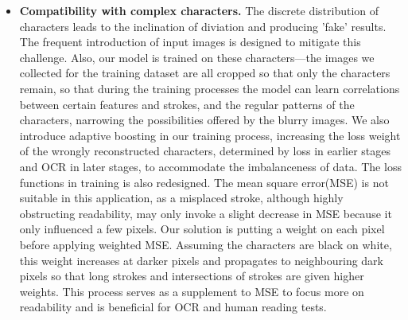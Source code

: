 \begin{itemize}[leftmargin=*]
  \item \textbf{Compatibility with complex characters.} The discrete distribution of characters leads to the inclination of diviation and producing 'fake' results. The frequent introduction of input images is designed to mitigate this challenge. Also, our model is trained on these characters---the images we collected for the training dataset are all cropped so that only the characters remain, so that during the training processes the model can learn correlations between certain features and strokes, and the regular patterns of the characters, narrowing the possibilities offered by the blurry images. We also introduce adaptive boosting\cite{adaboost} in our training process, increasing the loss weight of the wrongly reconstructed characters, determined by loss in earlier stages and OCR in later stages, to accommodate the imbalanceness of data. The loss functions in training is also redesigned. The mean square error(MSE) is not suitable in this application, as a misplaced stroke, although highly obstructing readability, may only invoke a slight decrease in MSE because it only influenced a few pixels. Our solution is putting a weight on each pixel before applying weighted MSE. Assuming the characters are black on white, this weight increases at darker pixels and propagates to neighbouring dark pixels so that long strokes and intersections of strokes are given higher weights. This process serves as a supplement to MSE to focus more on readability and is beneficial for OCR and human reading tests. 
\end{itemize}